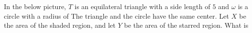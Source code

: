 In the below picture, $T$ is an equilateral triangle with a side length of $5$ and $\omega$ is a circle with a radius of  The triangle and the circle have the same center. Let $X$ be the area of the shaded region, and let $Y$ be the area of the starred region. What is 